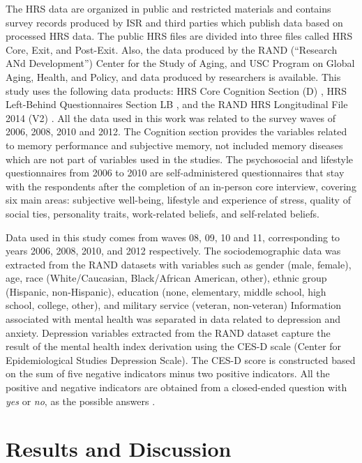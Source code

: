 \documentclass[conference,final,]{IEEEtran}
\begin{document}
The HRS data are organized in public and restricted materials and
contains survey records produced by ISR and third parties which publish
data based on processed HRS data. The public HRS files are divided into
three files called HRS Core, Exit, and Post-Exit. Also, the data
produced by the RAND (``Research ANd Development'') Center for the Study
of Aging, and USC Program on Global Aging, Health, and Policy, and data
produced by researchers is available. This study uses the following data
products: HRS Core Cognition Section (D) \cite{sonnega2014health}, HRS
Left-Behind Questionnaires Section LB \cite{smith2013psychosocial}, and
the RAND HRS Longitudinal File 2014 (V2) \cite{HRS2014}. All the data
used in this work was related to the survey waves of 2006, 2008, 2010
and 2012. The Cognition section provides the variables related to memory
performance and subjective memory, not included memory diseases which
are not part of variables used in the studies. The psychosocial and
lifestyle questionnaires from 2006 to 2010 are self-administered
questionnaires that stay with the respondents after the completion of an
in-person core interview, covering six main areas: subjective
well-being, lifestyle and experience of stress, quality of social ties,
personality traits, work-related beliefs, and self-related beliefs.

Data used in this study comes from waves 08, 09, 10 and 11,
corresponding to years 2006, 2008, 2010, and 2012 respectively. The
sociodemographic data was extracted from the RAND datasets with
variables such as gender (male, female), age, race (White/Caucasian,
Black/African American, other), ethnic group (Hispanic, non-Hispanic),
education (none, elementary, middle school, high school, college,
other), and military service (veteran, non-veteran) Information
associated with mental health was separated in data related to
depression and anxiety. Depression variables extracted from the RAND
dataset capture the result of the mental health index derivation using
the CES-D scale (Center for Epidemiological Studies Depression Scale).
The CES-D score is constructed based on the sum of five negative
indicators minus two positive indicators. All the positive and negative
indicators are obtained from a closed-ended question with \emph{yes} or
\emph{no}, as the possible answers \cite{cesd}.

\hypertarget{results-and-discussion}{%
\section{Results and Discussion}\label{results-and-discussion}}
\end{document}
